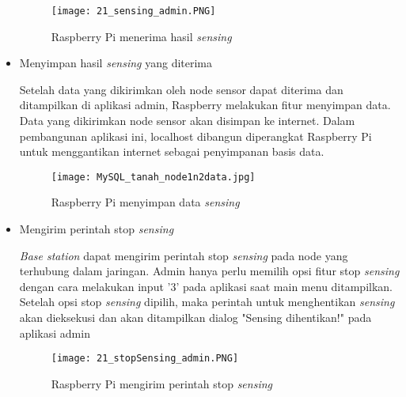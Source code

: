 \begin{itemize}
        \begin{figure}[H]
        	\centering  
        	\texttt{[image: 21\_sensing\_admin.PNG]}  
        	\caption[Raspberry Pi menerima hasil \textit{sensing}]{Raspberry Pi menerima hasil \textit{sensing}} 
        	\label{fig:Raspberry Pi menerima hasil sensing} 
        \end{figure}
        
        \item Menyimpan hasil \textit{sensing} yang diterima
        
        Setelah data yang dikirimkan oleh node sensor dapat diterima dan ditampilkan di aplikasi admin, Raspberry melakukan fitur menyimpan data. Data yang dikirimkan node sensor akan disimpan ke internet. Dalam pembangunan aplikasi ini, localhost dibangun diperangkat Raspberry Pi untuk menggantikan internet sebagai penyimpanan basis data.
        
        \begin{figure}[H]
        	\centering  
        	\texttt{[image: MySQL\_tanah\_node1n2data.jpg]}  
        	\caption[Raspberry Pi menyimpan data sensing]{Raspberry Pi menyimpan data \textit{sensing}} 
        	\label{fig:Raspberry Pi menyimpan data sensing} 
        \end{figure}
        
        
        \item Mengirim perintah stop \textit{sensing}
        
        \textit{Base station} dapat mengirim perintah stop \textit{sensing} pada node yang terhubung dalam jaringan. Admin hanya perlu memilih opsi fitur stop \textit{sensing} dengan cara melakukan input '3' pada aplikasi saat main menu ditampilkan. Setelah opsi stop \textit{sensing} dipilih, maka perintah untuk menghentikan \textit{sensing} akan dieksekusi dan akan ditampilkan dialog "Sensing dihentikan!" pada aplikasi admin
        
        \begin{figure}[H]
        	\centering  
        	\texttt{[image: 21\_stopSensing\_admin.PNG]}  
        	\caption[Raspberry Pi mengirim perintah stop \textit{sensing}]{Raspberry Pi mengirim perintah stop \textit{sensing}} 
        	\label{fig:Raspberry Pi mengirim perintah stop sensing} 
        \end{figure}
        

\end{itemize}
